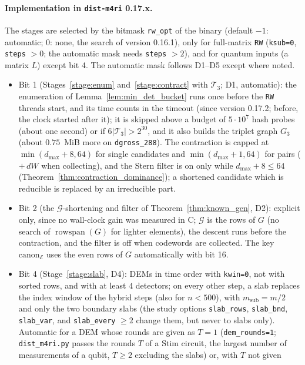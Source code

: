\documentclass[12pt]{article}
\theoremstyle{definition}
\newcommand{\Tc}{\mathcal{T}_3}
\newcommand{\Gc}{\mathcal{G}}
\newcommand{\ttt}[1]{\texttt{#1}}
\begin{document}
\paragraph{Implementation in \texorpdfstring{\ttt{dist-m4ri}}{dist-m4ri} 0.17.x.}
The stages are selected by the bitmask \ttt{rw\_opt} of the binary (default $-1$: automatic; $0$: none, the search of
version 0.16.1), only for full-matrix \ttt{RW} (\ttt{ksub=0}, \ttt{steps} $> 0$; the automatic mask needs \ttt{steps}
$> 2$), and for quantum inputs (a matrix $L$) except bit 4. The automatic mask follows D1--D5 except where noted.
\begin{itemize}
  \item Bit 1 (Stages~\ref{stage:enum} and~\ref{stage:contract} with $\Tc$; D1, automatic): the enumeration of
    Lemma~\ref{lem:min_det_bucket} runs once before the \ttt{RW} threads start, and its time counts in the timeout
    (since version 0.17.2; before, the clock started after it); it is
    skipped above a budget of $5 \cdot 10^7$ hash probes (about one second) or if $6|\Tc| > 2^{30}$, and it also
    builds the triplet graph $G_3$ (about $0.75$~MiB more on \ttt{dgross\_288}). The contraction is capped at
    $\min(d_{\max} + 8, 64)$ for single candidates and $\min(d_{\max} + 1, 64)$ for pairs ($+\,dW$ when collecting),
    and the Stern filter is on only while $d_{\max} + 8 \le 64$ (Theorem~\ref{thm:contraction_dominance}); a
    shortened candidate which is reducible is replaced by an irreducible part.
  \item Bit 2 (the $\Gc$-shortening and filter of Theorem~\ref{thm:known_gen}, D2): explicit only, since no
    wall-clock gain was measured in C; $\Gc$ is the rows of $G$ (no search of $\operatorname{rowspan}(G)$ for lighter
    elements), the descent runs before the contraction, and the filter is off when codewords are collected. The key
    $\mathrm{canon}_{\mathcal{E}}$ uses the even rows of $G$ automatically with bit 16.
  \item Bit 4 (Stage~\ref{stage:slab}, D4): DEMs in time order with \ttt{kwin=0}, not with sorted rows, and with at
    least $4$ detectors; on every other step, a slab replaces the index window of the hybrid steps (also for $n <
    500$), with $m_{\mathrm{sub}} = m/2$ and only the two boundary slabs (the study options \ttt{slab\_rows},
    \ttt{slab\_bnd}, \ttt{slab\_var}, and \ttt{slab\_every} $\ge 2$ change them, but never to slabs only). Automatic
    for a DEM whose rounds are given as $T = 1$ (\ttt{dem\_rounds=1}; \ttt{dist\_m4ri.py} passes the rounds $T$ of a
    Stim circuit, the largest number of measurements of a qubit, $T \ge 2$ excluding the slabs) or, with $T$ not given

\end{itemize}
\end{document}
